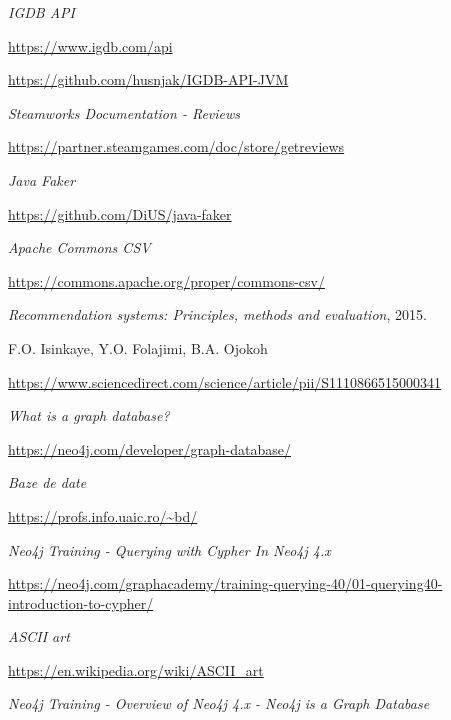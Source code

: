 \documentclass[12pt,a4paper]{report}
\begin{document}
\begin{thebibliography}{9}

  
  \textit{IGDB API}
  
  \url{https://www.igdb.com/api}
  
  \url{https://github.com/husnjak/IGDB-API-JVM}
  
  
  \textit{Steamworks Documentation - Reviews}
  
  \url{https://partner.steamgames.com/doc/store/getreviews}
  
  
  \textit{Java Faker}
  
  \url{https://github.com/DiUS/java-faker}
  
  
  \textit{Apache Commons CSV}
  
  \url{https://commons.apache.org/proper/commons-csv/}


  
  \textit{Recommendation systems: Principles, methods and evaluation},
  2015.
  
  F.O. Isinkaye, Y.O. Folajimi, B.A. Ojokoh
  
  \url{https://www.sciencedirect.com/science/article/pii/S1110866515000341}
  
  
  \textit{What is a graph database?}
  
  \url{https://neo4j.com/developer/graph-database/}
  
  
  \textit{Baze de date}
  
  \url{https://profs.info.uaic.ro/~bd/}
  
  
  \textit{Neo4j Training - Querying with Cypher In Neo4j 4.x}
  
  \url{https://neo4j.com/graphacademy/training-querying-40/01-querying40-introduction-to-cypher/}
  
  
  \textit{ASCII art}
  
  \url{https://en.wikipedia.org/wiki/ASCII_art}
  
  
  \textit{Neo4j Training - Overview of Neo4j 4.x - Neo4j is a Graph Database  }
  

\end{thebibliography}
\end{document}

